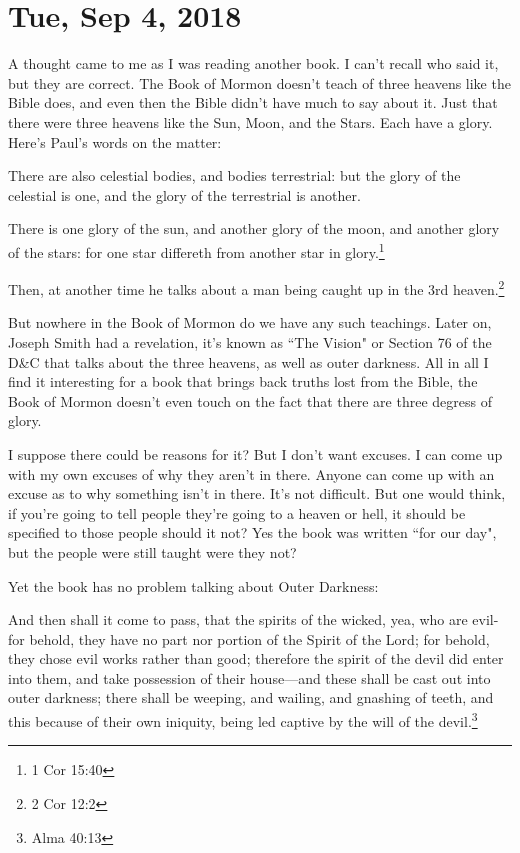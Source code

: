 \section{Tue, Sep 4, 2018}

A thought came to me as I was reading another book. I can't recall who said it, but
they are correct. The Book of Mormon doesn't teach of three heavens like the Bible
does, and even then the Bible didn't have much to say about it. Just that there were
three heavens like the Sun, Moon, and the Stars. Each have a glory. Here's Paul's
words on the matter:

\begin{displayquote}
There are also celestial bodies, and bodies terrestrial: but the glory of the 
celestial is one, and the glory of the terrestrial is another.

There is one glory of the sun, and another glory of the moon, and another glory of 
the stars: for one star differeth from another star in glory.\footnote{1 Cor 15:40}
\end{displayquote}

Then, at another time he talks about a man being caught up in the 3rd
heaven.\footnote{2 Cor 12:2}

But nowhere in the Book of Mormon do we have any such teachings. Later on, Joseph
Smith had a revelation, it's known as ``The Vision" or Section 76 of the D\&C that
talks about the three heavens, as well as outer darkness. All in all I find it
interesting for a book that brings back truths lost from the Bible, the Book of
Mormon doesn't even touch on the fact that there are three degress of glory.

I suppose there could be reasons for it? But I don't want excuses. I can come up with
my own excuses of why they aren't in there. Anyone can come up with an excuse as to
why something isn't in there. It's not difficult. But one would think, if you're
going to tell people they're going to a heaven or hell, it should be specified to
those people should it not? Yes the book was written ``for our day", but the people
were still taught were they not?

Yet the book has no problem talking about Outer Darkness:

\begin{displayquote}
And then shall it come to pass, that the spirits of the wicked, yea, who are 
evil-for behold, they have no part nor portion of the Spirit of the Lord; for 
behold, they chose evil works rather than good; therefore the spirit of the devil 
did enter into them, and take possession of their house—and these shall be cast out 
into outer darkness; there shall be weeping, and wailing, and gnashing of teeth, 
and this because of their own iniquity, being led captive by the will of the 
devil.\footnote{Alma 40:13}
\end{displayquote}


